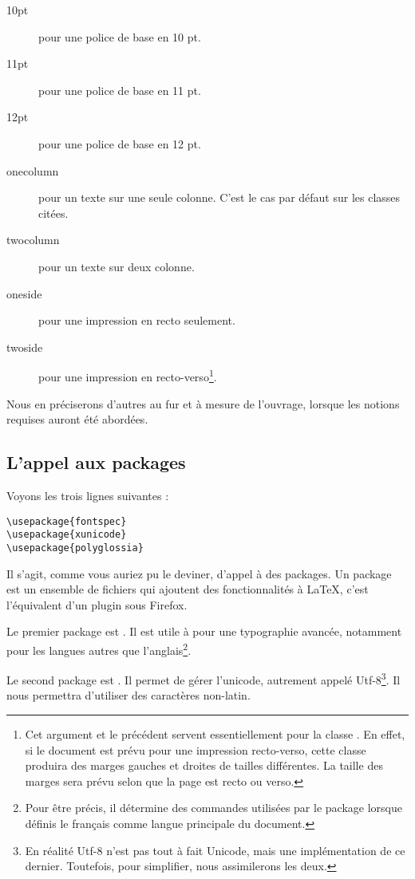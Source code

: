 \begin{description}
\item[10pt] pour une police de base en 10 pt.
\item[11pt] pour une police de base en 11 pt.
\item[12pt] pour une police de base en 12 pt.
\item[onecolumn] pour un texte sur une seule colonne. C'est le cas par défaut sur les classes citées.
\item[twocolumn] pour un texte sur deux colonne.
\item[oneside] pour une impression en recto seulement.
\item[twoside] pour une impression en recto-verso\footnote{Cet argument et le précédent servent essentiellement pour la classe . En effet, si le document est prévu pour une impression recto-verso, cette classe produira des marges gauches et droites de tailles différentes. La taille des marges sera prévu selon que la page est recto ou verso.}.\label{rectoverso}
\end{description}

Nous en préciserons d'autres au fur et à mesure de l'ouvrage, lorsque les notions requises auront été abordées.

\subsection{L'appel aux packages}

Voyons les trois lignes suivantes : 
\begin{verbatim}
\usepackage{fontspec}
\usepackage{xunicode}
\usepackage{polyglossia}
\end{verbatim}

Il s'agit, comme vous auriez pu le deviner, d'appel à des packages. Un package est un ensemble de fichiers qui ajoutent des fonctionnalités à \LaTeX, c'est l'équivalent d'un plugin sous Firefox. 

Le premier package est . Il est utile à \XeLaTeX  pour une typographie avancée, notamment pour les langues autres que l'anglais\footnote{Pour être précis, il détermine des commandes utilisées par le package  lorsque définis le fran\c cais comme langue principale du document.}. 

Le second package est . Il permet de gérer l'unicode, autrement appelé Utf-8\footnote{En réalité Utf-8 n'est pas tout à fait Unicode, mais une implémentation de ce dernier. Toutefois, pour simplifier, nous assimilerons les deux.}. Il nous permettra d'utiliser des caractères non-latin.

